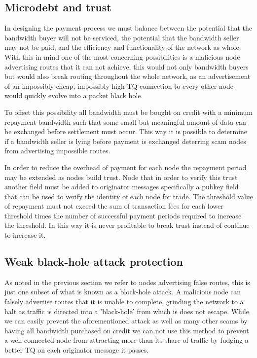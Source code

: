 \documentclass[11pt]{article}
\begin{document}
	\subsection{Microdebt and trust}

               In designing the payment process we must balance between the potential that the bandwidth buyer will not be serviced, the potential that the bandwidth seller may not be paid, and the efficiency and functionality of the network as whole. With this in mind one of the most concerning possibilities is a malicious node advertising routes that it can not achieve, this would not only bandwidth buyers but would also break routing throughout the whole network, as an advertisement of an impossibly cheap, impossibly high TQ connection to every other node would quickly evolve into a packet black hole.

               To offset this possibility all bandwidth must be bought on credit with a minimum repayment bandwidth such that some small but meaningful amount of data can be exchanged before settlement must occur. This way it is possible to determine if a bandwidth seller is lying before payment is exchanged deterring scam nodes from advertising impossible routes.

               In order to reduce the overhead of payment for each node the repayment period may be extended as nodes build trust. Node that in order to verify this trust another field must be added to originator messages specifically a pubkey field that can be used to verify the identity of each node for trade. The threshold value of repayment must not exceed the sum of transaction fees for each lower threshold times the number of successful payment periods required to increase the threshold. In this way it is never profitable to break trust instead of continue to increase it.
               
    \subsection{Weak black-hole attack protection}
    
               As noted in the previous section we refer to nodes advertising false routes, this is just one subset of what is known as a block-hole attack. A malicious node can falsely advertise routes that it is unable to complete, grinding the network to a halt as traffic is directed into a 'black-hole' from which is does not escape. While we can easily prevent the aforementioned attack as well as many other scams by having all bandwidth purchased on credit we can not use this method to prevent a well connected node from attracting more than its share of traffic by fudging a better TQ on each originator message it passes.
               
\end{document}

